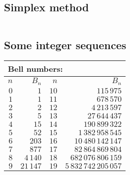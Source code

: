 \documentclass{article}
\begin{document}
\subsection{Simplex method}
\inputminted[mathescape, breaklines, breakafter=(, tabsize=2, frame=lines, showtabs, tab=|\ , tabcolor=lightgray]{c++}{./numeric/simplex/simplex.cpp}
\subsection{Some integer sequences}
\begin{center}
\begin{tabular}{|r|r|r|r|}
\hline
\multicolumn{4}{|l|}{Bell numbers:} \\
\hline
$n$ & $B_n$ & $n$ & $B_n$ \\
\hline
$0$ & $1$ & $10$ & $115\,975$ \\
\hline
$1$ & $1$ & $11$ & $678\,570$ \\
\hline
$2$ & $2$ & $12$ & $4\,213\,597$ \\
\hline
$3$ & $5$ & $13$ & $27\,644\,437$ \\
\hline
$4$ & $15$ & $14$ & $190\,899\,322$ \\
\hline
$5$ & $52$ & $15$ & $1\,382\,958\,545$ \\
\hline
$6$ & $203$ & $16$ & $10\,480\,142\,147$ \\
\hline
$7$ & $877$ & $17$ & $82\,864\,869\,804$ \\
\hline
$8$ & $4\,140$ & $18$ & $682\,076\,806\,159$ \\
\hline
$9$ & $21\,147$ & $19$ & $5\,832\,742\,205\,057$\\
\hline
\end{tabular}
\end{center}
\end{document}
